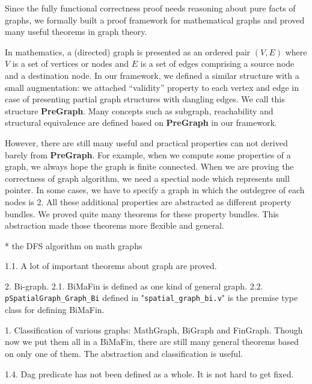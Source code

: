 Since the fully functional correctness proof needs reasoning about
pure facts of graphs, we formally built a proof framework for
mathematical graphs and proved many useful theorems in graph
theory.

In mathematics, a (directed) graph is presented as an ordered pair
$(V, E)$ where $V$ is a set of vertices or nodes and $E$ is a set of
edges comprising a source node and a destination node. In our
framework, we defined a similar structure with a small augmentation:
we attached ``validity'' property to each vertex and edge in case of
presenting partial graph structures with dangling edges. We call this
structure \textbf{PreGraph}. Many concepts such as subgraph,
reachability and structural equivalence are defined based
on \textbf{PreGraph} in our framework.

However, there are still many useful and practical properties can not
derived barely from \textbf{PreGraph}. For example, when we compute
some properties of a graph, we always hope the graph is finite
connected. When we are proving the correctness of graph algorithm, we
need a spectial node which represents null pointer. In some cases, we
have to specify a graph in which the outdegree of each nodes is 2. All
these additional properties are abstracted as different property
bundles. We proved quite many theorems for these property
bundles. This abstraction made those theorems more flexible and
general.

* the DFS algorithm on math graphs

1.1. A lot of important theorems about graph are proved.

2. Bi-graph.
2.1. BiMaFin is defined as one kind of general graph.
2.2. \texttt{pSpatialGraph\_Graph\_Bi} defined in "\texttt{spatial\_graph\_bi.v}" is the premise type class for defining BiMaFin.

1. Classification of various graphs: MathGraph, BiGraph and FinGraph. Though now we put them all in a BiMaFin, there are still many general theorems based on only one of them. The abstraction and classification is useful.

1.4. Dag predicate has not been defined as a whole. It is not hard to get fixed.
